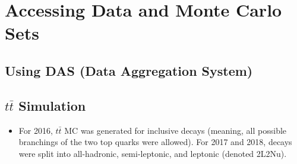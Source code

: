 \section{Accessing Data and Monte Carlo Sets}

\subsection*{Using DAS (Data Aggregation System)}

\subsection*{$t\bar{t}$ Simulation}
\begin{itemize}
    \item For 2016, $t\bar{t}$ MC was generated for inclusive decays (meaning, all possible branchings of the two top quarks were allowed). For 2017 and 2018, decays were split into all-hadronic, semi-leptonic, and leptonic (denoted 2L2Nu).
\end{itemize}